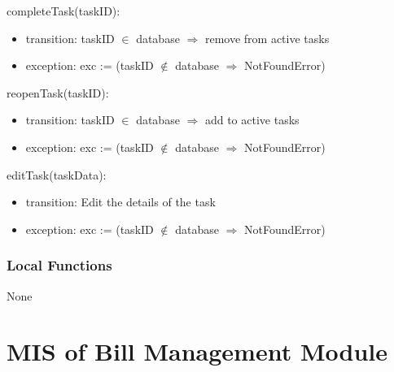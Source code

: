 \documentclass[12pt, titlepage]{article}
\begin{document}
\noindent completeTask(taskID):
\begin{itemize}
\item transition: taskID $\in$ database $\Rightarrow$ remove from active tasks
\item exception: exc := (taskID $\notin$ database $\Rightarrow$ NotFoundError)
\end{itemize}

\noindent reopenTask(taskID):
\begin{itemize}
\item transition: taskID $\in$ database $\Rightarrow$ add to active tasks
\item exception: exc := (taskID $\notin$ database $\Rightarrow$ NotFoundError)
\end{itemize}

\noindent editTask(taskData):
\begin{itemize}
\item transition: Edit the details of the task
\item exception: exc := (taskID $\notin$ database $\Rightarrow$ NotFoundError)
\end{itemize}




\subsubsection{Local Functions}


None



\section{MIS of Bill Management Module} \label{mB} 

\end{document}

